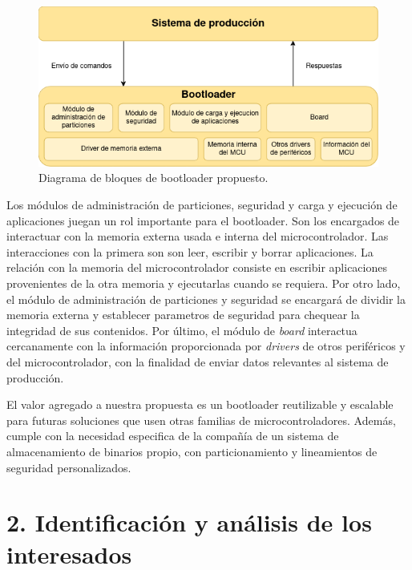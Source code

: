 \documentclass[
11pt, %
]{charter}
\begin{document}
\begin{figure}[htpb]
\centering 
\includegraphics[width=.80\textwidth]{./Figuras/GdPDiagrams-sec1_solution.png}
\caption{Diagrama de bloques de bootloader propuesto.}
\label{fig:sec1BootloaderSolution}
\end{figure}

Los módulos de administración de particiones, seguridad y carga y ejecución de aplicaciones juegan un rol importante para el bootloader. Son los encargados de interactuar con la memoria externa usada e interna del microcontrolador. Las interacciones con la primera son son leer, escribir y borrar aplicaciones. La relación con la memoria del microcontrolador consiste en escribir aplicaciones provenientes de la otra memoria y ejecutarlas cuando se requiera. Por otro lado, el módulo de administración de particiones y seguridad se encargará de dividir la memoria externa y establecer parametros de seguridad para chequear la integridad de sus contenidos. Por último, el módulo de \textit{board} interactua cercanamente con la información proporcionada por \textit{drivers} de otros periféricos y del microcontrolador, con la finalidad de enviar datos relevantes al sistema de producción.

El valor agregado a nuestra propuesta es un bootloader reutilizable y escalable para futuras soluciones que usen otras familias de microcontroladores. Además, cumple con la necesidad especifica de la compañía de un sistema de almacenamiento de binarios propio, con particionamiento y lineamientos de seguridad personalizados.

\newpage

\section{2. Identificación y análisis de los interesados}
\label{sec:interesados}
\end{document}
